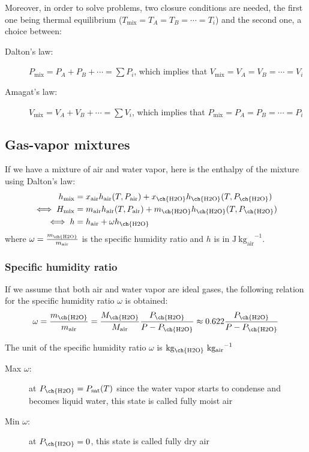 \documentclass[10pt, twocolumn]{article}
\begin{document}
Moreover, in order to solve problems, two closure conditions are needed, the first one being thermal equilibrium (\(T_\mathrm{mix} = T_A = T_B = \cdots = T_i\)) and the second one, a choice between:
\begin{description}
  \item[Dalton's law:] \(P_\mathrm{mix} = P_A + P_B + \cdots = \sum{P_i}\), which implies that \(V_\mathrm{mix} = V_A = V_B = \cdots = V_i\)
  \item[Amagat's law:] \(V_\mathrm{mix} = V_A + V_B + \cdots = \sum{V_i}\), which implies that \(P_\mathrm{mix} = P_A = P_B = \cdots = P_i\)
\end{description}


\subsection{Gas-vapor mixtures}
If we have a mixture of air and water vapor, here is the enthalpy of the mixture using Dalton's law:
\begin{align*}
  h_\mathrm{mix}      & = x_\mathrm{air} h_\mathrm{air}(T,P_\mathrm{air}) + x_\mathrm{\ch{H2O}} h_\mathrm{\ch{H2O}}(T,P_\mathrm{\ch{H2O}}) \\
  \iff H_\mathrm{mix} & = m_\mathrm{air} h_\mathrm{air}(T,P_\mathrm{air}) + m_\mathrm{\ch{H2O}} h_\mathrm{\ch{H2O}}(T,P_\mathrm{\ch{H2O}}) \\
  \iff h              & = h_\mathrm{air} + \omega h_\mathrm{\ch{H2O}}
\end{align*}
where \(\omega = \frac{m_\mathrm{\ch{H2O}}}{m_\mathrm{air}}\) is the specific humidity ratio and \(h\) is in \(\si{\joule}\mathrm{\ {\si{\kilogram}_{air}}^{-1}}\).


\subsubsection{Specific humidity ratio}
If we assume that both air and water vapor are ideal gases, the following relation for the specific humidity ratio \(\omega\) is obtained:
\[
  \omega = \frac{m_\mathrm{\ch{H2O}}}{m_\mathrm{air}} = \frac{M_\mathrm{\ch{H2O}}}{M_\mathrm{air}} \frac{P_\mathrm{\ch{H2O}}}{P - P_\mathrm{\ch{H2O}}} \approx 0.622 \frac{P_\mathrm{\ch{H2O}}}{P - P_\mathrm{\ch{H2O}}}
\]

The unit of the specific humidity ratio \(\omega\) is \(\mathrm{kg_{\ch{H2O}}\ {kg_{air}}^{-1}}\)

\begin{description}
  \item[Max \(\omega\):] at \(P_\mathrm{\ch{H2O}} = P_\mathrm{sat}(T)\) since the water vapor starts to condense and becomes liquid water, this state is called fully moist air
  \item[Min \(\omega\):] at \(P_\mathrm{\ch{H2O}} = 0\), this state is called fully dry air
\end{description}
\end{document}
